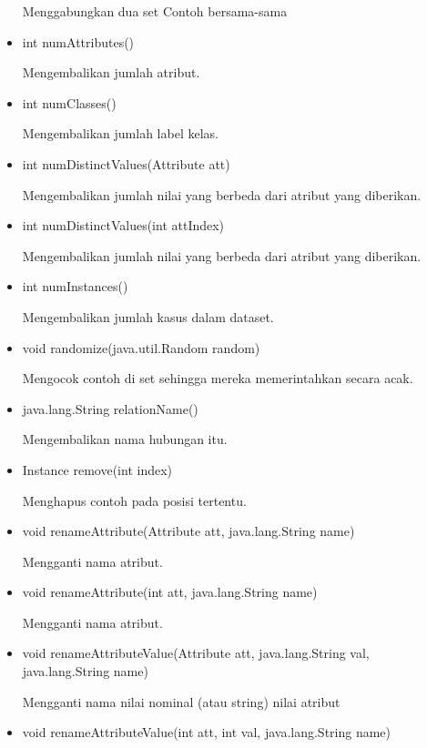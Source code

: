 \begin{itemize}
	Menggabungkan dua set Contoh bersama-sama
	
	\item int numAttributes()
	
	Mengembalikan jumlah atribut.
	
	\item int numClasses()
	
	Mengembalikan jumlah label kelas.
	
	\item int numDistinctValues(Attribute att)
	
	Mengembalikan jumlah nilai yang berbeda dari atribut yang diberikan.
	
	\item int numDistinctValues(int attIndex)
	
	Mengembalikan jumlah nilai yang berbeda dari atribut yang diberikan.
	
	\item int numInstances()
	
	Mengembalikan jumlah kasus dalam dataset.
	
	\item void randomize(java.util.Random random)
	
	Mengocok contoh di set sehingga mereka memerintahkan secara acak.
	
	\item java.lang.String relationName()
	
	Mengembalikan nama hubungan itu.
	
	\item Instance remove(int index)
	
	Menghapus contoh pada posisi tertentu.
	
	\item void renameAttribute(Attribute att, java.lang.String name)
	
	Mengganti nama atribut.
	
	\item void renameAttribute(int att, java.lang.String name)
	
	Mengganti nama atribut.
	
	\item void renameAttributeValue(Attribute att, java.lang.String val, java.lang.String name)
	
	Mengganti nama nilai nominal (atau string) nilai atribut
	
	\item void renameAttributeValue(int att, int val, java.lang.String name)
	

\end{itemize}
